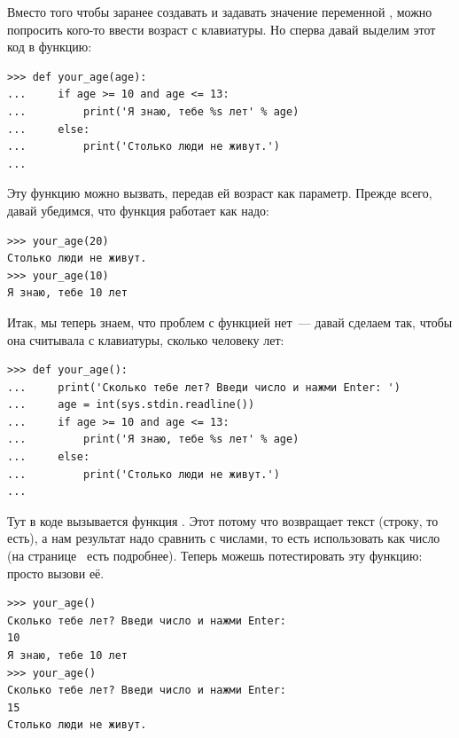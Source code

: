 Вместо того чтобы заранее создавать и задавать значение переменной , можно попросить кого-то ввести возраст с клавиатуры. Но сперва давай выделим этот код в функцию:

\begin{listing}
\begin{verbatim}
>>> def your_age(age):
...     if age >= 10 and age <= 13:
...         print('Я знаю, тебе %s лет' % age)
...     else:
...         print('Столько люди не живут.')
... 
\end{verbatim}
\end{listing}

Эту функцию можно вызвать, передав ей возраст как параметр. Прежде всего, давай убедимся, что функция работает как надо:

\begin{listing}
\begin{verbatim}
>>> your_age(20)
Столько люди не живут.
>>> your_age(10)
Я знаю, тебе 10 лет
\end{verbatim}
\end{listing}

Итак, мы теперь знаем, что проблем с функцией нет — давай сделаем так, чтобы она считывала с клавиатуры, сколько человеку лет:

\begin{listing}
\begin{verbatim}
>>> def your_age():
...     print('Сколько тебе лет? Введи число и нажми Enter: ')
...     age = int(sys.stdin.readline())
...     if age >= 10 and age <= 13:
...         print('Я знаю, тебе %s лет' % age)
...     else:
...         print('Столько люди не живут.')
... 
\end{verbatim}
\end{listing}

Тут в коде вызывается функция . Этот потому что  возвращает текст (строку, то есть), а нам результат надо сравнить с числами, то есть использовать как число (на странице \pageref{whatsthedifference} есть подробнее). Теперь можешь потестировать эту функцию: просто вызови её.

\begin{listing}
\begin{verbatim}
>>> your_age()
Сколько тебе лет? Введи число и нажми Enter:
10
Я знаю, тебе 10 лет
>>> your_age()
Сколько тебе лет? Введи число и нажми Enter:
15
Столько люди не живут.
\end{verbatim}
\end{listing}

